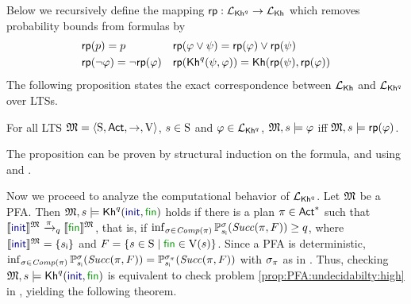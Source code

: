 Below we recursively define the mapping $\fgetprob:\PKh\to\Khlogic$ which removes probability bounds from formulas by
%
\begin{align*}
  & \fgetprob(p) = p
  && \fgetprob(\varphi \vee \psi) = \fgetprob(\varphi) \vee \fgetprob(\psi)\\
  & \fgetprob(\neg \varphi) = \neg \fgetprob(\varphi)
  && \fgetprob(\kh^q(\psi,\varphi)) = \kh(\fgetprob(\psi),\fgetprob(\varphi))
\end{align*}
%
The following proposition states the exact correspondence between
$\Khlogic$ and $\PKh$ over LTSs.
%
\begin{proposition}\label{prop:Kh:PKh}
    For all LTS $\model = \tup{\S,\Act,\ra,\V}$, $s\in\S$ and
    $\varphi\in\PKh$,
    $\model,s\models\varphi$ iff $\model,s\models\fgetprob(\varphi)$.
\end{proposition}

The proposition can be proven by structural induction on
the formula, and using
 and .

Now we proceed to analyze the computational behavior of $\PKh$. 
Let $\model$ be a PFA. Then $\model,s\models\kh^q(\init,\fin)$ holds
if there is a plan $\plan\in \Act^*$ such that
$\truthset{\model}{\init}\reach{\plan}_q\truthset{\model}{\fin}$, that
is, if
$\inf_{\strat\in\Comp(\plan)}\Prob^\strat_{\sini}(\Succ(\plan,F)) \geq q$,
where $\truthset{\model}{\init}=\{\sini\}$ and
$F=\{{s\in\S}\mid{\fin\in\V(s)}\}$.
%
Since a PFA is deterministic,
$\inf_{\strat\in\Comp(\plan)}\Prob^\strat_{\sini}(\Succ(\plan,F)) =
\Prob^{\strat_\plan}_{\sini}(\Succ(\plan,F))$
with $\strat_\plan$ as in .
%
%
Thus, checking $\model,s\models\kh^q(\init,\fin)$ is equivalent to
check problem \ref{prop:PFA:undecidabilty:high} in
,
yielding the following theorem.

